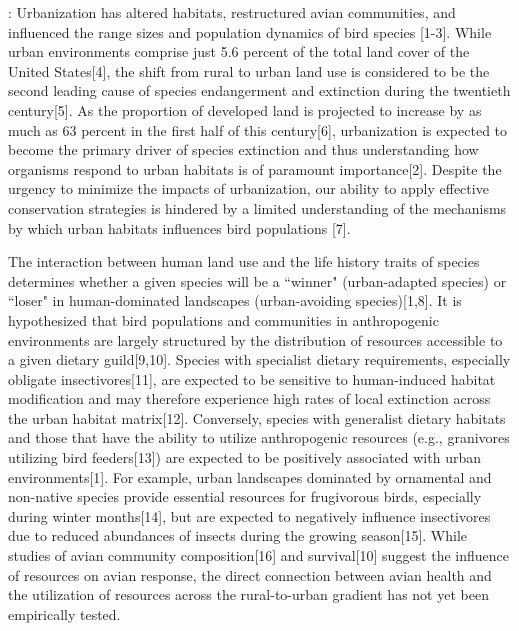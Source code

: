 \documentclass[12pt]{article}
\date{}
\begin{document}
\maketitle \vspace{-2cm}


\doublespace
{}: Urbanization has altered habitats, restructured avian communities, and influenced the range sizes and population dynamics of bird species [1-3]. While urban environments comprise just 5.6 percent of the total land cover of the United States[4], the shift from rural to urban land use is considered to be the second leading cause of species endangerment and extinction during the twentieth century[5]. As the proportion of developed land is projected to increase by as much as 63 percent in the first half of this century[6], urbanization is expected to become the primary driver of species extinction and thus understanding how organisms respond to urban habitats is of paramount importance[2]. Despite the urgency to minimize the impacts of urbanization, our ability to apply effective conservation strategies is hindered by a limited understanding of the mechanisms by which urban habitats influences bird populations [7]. \par

The interaction between human land use and the life history traits of species determines whether a given species will be a ``winner" (urban-adapted species) or ``loser" in human-dominated landscapes (urban-avoiding species)[1,8]. It is hypothesized that bird populations and communities in anthropogenic environments are largely structured by the distribution of resources accessible to a given dietary guild[9,10]. Species with specialist dietary requirements, especially obligate insectivores[11], are expected to be sensitive to human-induced habitat modification and may therefore experience high rates of local extinction across the urban habitat matrix[12]. Conversely, species with generalist dietary habitats and those that have the ability to utilize anthropogenic resources (e.g., granivores utilizing bird feeders[13]) are expected to be positively associated with urban environments[1]. For example, urban landscapes dominated by ornamental and non-native species provide essential resources for frugivorous birds, especially during winter months[14], but are expected to negatively influence insectivores due to reduced abundances of insects during the growing season[15]. While studies of avian community composition[16] and survival[10] suggest the influence of resources on avian response, the direct connection between avian health and the utilization of resources across the rural-to-urban gradient has not yet been empirically tested.\par
\end{document}
